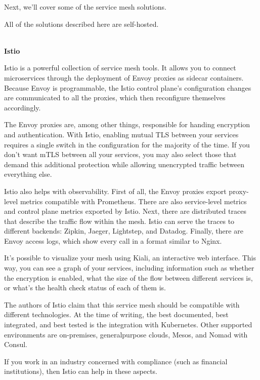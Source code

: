Next, we'll cover some of the service mesh solutions.


All of the solutions described here are self-hosted.

\hspace*{\fill} \\ %
\noindent
\textbf{Istio}

Istio is a powerful collection of service mesh tools. It allows you to connect microservices through the deployment of Envoy proxies as sidecar containers. Because Envoy is programmable, the Istio control plane's configuration changes are communicated to all the proxies, which then reconfigure themselves accordingly.

The Envoy proxies are, among other things, responsible for handing encryption and authentication. With Istio, enabling mutual TLS between your services requires a single switch in the configuration for the majority of the time. If you don't want mTLS between all your services, you may also select those that demand this additional protection while allowing unencrypted traffic between everything else.

Istio also helps with observability. First of all, the Envoy proxies export proxy-level metrics compatible with Prometheus. There are also service-level metrics and control plane metrics exported by Istio. Next, there are distributed traces that describe the traffic flow within the mesh. Istio can serve the traces to different backends: Zipkin, Jaeger, Lightstep, and Datadog. Finally, there are Envoy access logs, which show every call in a format similar to Nginx.

It's possible to visualize your mesh using Kiali, an interactive web interface. This way, you can see a graph of your services, including information such as whether the encryption is enabled, what the size of the flow between different services is, or what's the health check status of each of them is.

The authors of Istio claim that this service mesh should be compatible with different technologies. At the time of writing, the best documented, best integrated, and best tested is the integration with Kubernetes. Other supported environments are on-premises, generalpurpose clouds, Mesos, and Nomad with Consul.

If you work in an industry concerned with compliance (such as financial institutions), then Istio can help in these aspects.

